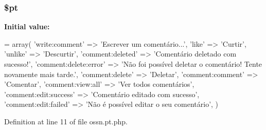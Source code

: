 \subsubsection[{\texorpdfstring{\$pt}{$pt}}]{\setlength{\rightskip}{0pt plus 5cm}\$pt}\hypertarget{components_2_ossn_comments_2locale_2ossn_8pt_8php_a62c150775a7a00e8663463c638016cad}{}\label{components_2_ossn_comments_2locale_2ossn_8pt_8php_a62c150775a7a00e8663463c638016cad}
{\bfseries Initial value\+:}
\begin{DoxyCode}
= array(
    \textcolor{stringliteral}{'write:comment'} => \textcolor{stringliteral}{'Escrever um comentário...'},
    \textcolor{stringliteral}{'like'} => \textcolor{stringliteral}{'Curtir'},
    \textcolor{stringliteral}{'unlike'} => \textcolor{stringliteral}{'Descurtir'},
    \textcolor{stringliteral}{'comment:deleted'} => \textcolor{stringliteral}{'Comentário deletado com sucesso!'},
    \textcolor{stringliteral}{'comment:delete:error'} => \textcolor{stringliteral}{'Não foi possível deletar o comentário! Tente novamente mais tarde.'},
    \textcolor{stringliteral}{'comment:delete'} => \textcolor{stringliteral}{'Deletar'},
    \textcolor{stringliteral}{'comment:comment'} => \textcolor{stringliteral}{'Comentar'},
    \textcolor{stringliteral}{'comment:view:all'} => \textcolor{stringliteral}{'Ver todos comentários'},
    \textcolor{stringliteral}{'comment:edit:success'} => \textcolor{stringliteral}{'Comentário editado com sucesso'},
    \textcolor{stringliteral}{'comment:edit:failed'} => \textcolor{stringliteral}{'Não é possível editar o seu comentário'},
)
\end{DoxyCode}


Definition at line 11 of file ossn.\+pt.\+php.

